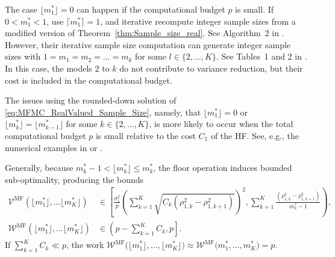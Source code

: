 The case $\lfloor m_1^* \rfloor = 0$ can happen if the computational budget $p$ is small.
If $0< m_1^* < 1$, \cite{AGruber_MGunzburger_LJu_ZWang_2023a} use $\lceil m_1^* \rceil = 1$,
and iterative recompute integer sample sizes from a modified version of 
Theorem~\ref{thm:Sample_size_real}. See Algorithm~2 in \cite{AGruber_MGunzburger_LJu_ZWang_2023a}.
However, their iterative sample size computation can generate integer sample sizes
with $1 = m_1 =  m_2 = \ldots = m_k$ for some $l \in \{ 2, \ldots, K\}$. 
See Tables~1 and 2 in \cite{AGruber_MGunzburger_LJu_ZWang_2023a}.
In this case, the models $2$ to $k$ do not contribute to variance reduction, but their cost is included in the
computational budget.

The issues using the rounded-down solution of \eqref{eq:MFMC_RealValued_Sample_Size},
namely, that $\lfloor m_1^* \rfloor = 0$ or  $\lfloor m_k^* \rfloor = \lfloor m_{k-1}^* \rfloor$ for some $k \in \{ 2, \ldots, K\}$, 
is more likely to occur when the total computational budget $p$ is small relative to the cost $C_1$ of the HF.
See, e.g., the numerical examples in  \cite{BPeherstorfer_KWillcox_MDGunzburger_2016a} or \cite{AGruber_MGunzburger_LJu_ZWang_2023a}.

Generally, because $m_k^*-1 < \lfloor m_k^*\rfloor \le m_k^*$, the floor operation induces bounded 
sub-optimality, producing the bounds
%
\begin{subequations}\label{eq:bounds_for_floor}
\begin{align}
    \mathcal{V}^{\text{MF}}\left(\lfloor m_1^* \rfloor, \ldots \lfloor m_K^* \rfloor \right)
    & \in \left[\frac{\sigma_1^2}{p}\left(\sum_{k=1}^K \sqrt{C_k  (\rho_{1,k}^2 - \rho_{1,k+1}^2)}\right)^2,
                   \sum_{k=1}^K\frac{ (\rho_{1,k}^2 - \rho_{1,k+1}^2)}{m_k^*-1}\right),       \\
   \mathcal{W}^{\text{MF}}\left(\lfloor m_1^* \rfloor, \ldots \lfloor m_K^* \rfloor \right)
   &\in \left( p-\sum_{k=1}^K C_k, p\right].
\end{align}
\end{subequations}
If $\sum_{k=1}^K C_k \ll p$, the work 
$\mathcal{W}^{\text{MF}}\big(\lfloor m_1^* \rfloor, \ldots, \lfloor m_K^* \rfloor \big)
 \approx  \mathcal{W}^{\text{MF}}\big( m_1^* , \ldots,  m_K^* \big) = p$.



